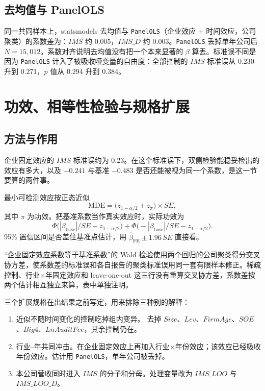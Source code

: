 \documentclass[11pt]{article}
\begin{document}
\subsection{去均值与 PanelOLS}

同一共同样本上，statsmodels 去均值与 \texttt{PanelOLS}（企业效应 + 时间效应，公司聚类）的系数差为：\(IMS\) 约 0.005，\(IMS\_D\) 约 0.003。\texttt{PanelOLS} 丢掉单年公司后 \(N=15{,}012\)。系数对齐说明去均值没有把一个本来显著的 \(\beta\) 算丢。标准误不同是因为 \texttt{PanelOLS} 计入了被吸收哑变量的自由度：全部控制的 \(IMS\) 标准误从 0.230 升到 0.271，\(p\) 值从 0.294 升到 0.384。

\section{功效、相等性检验与规格扩展}
\label{sec:power}

\subsection{方法与作用}

企业固定效应的 \(IMS\) 标准误约为 0.23。在这个标准误下，双侧检验能稳妥检出的效应有多大，以及 \(-0.241\) 与基准 \(-0.483\) 是否还能被视为同一个系数，是这一节要算的两件事。

最小可检测效应按正态近似
\begin{equation}
\mathrm{MDE}=\big(z_{1-\alpha/2}+z_{\pi}\big)\times SE,
\label{eq:mde}
\end{equation}
其中 \(\pi\) 为功效。把基准系数当作真实效应时，实际功效为
\[
\Phi\big(|\beta_{\mathrm{base}}|/SE-z_{1-\alpha/2}\big)+\Phi\big(-|\beta_{\mathrm{base}}|/SE-z_{1-\alpha/2}\big).
\]
95\% 置信区间是否盖住基准点估计，用 \(\hat\beta_{\mathrm{FE}}\pm 1.96\,SE\) 直接看。

``企业固定效应系数等于基准系数''的 Wald 检验使用两个回归的公司聚类得分交叉协方差，使系数差的标准误和各自报告的聚类标准误用同一套有限样本修正。稀疏控制、行业\(\times\)年固定效应和 leave-one-out 这三行没有重算交叉协方差，系数差按两个估计相互独立来算，表中单独注明。

三个扩展规格在出结果之前写定，用来排除三种别的解释：

\begin{enumerate}
\item 近似不随时间变化的控制吃掉组内变异。
去掉 \(Size\)、\(Lev\)、\(FirmAge\)、\(SOE\)、\(Big4\)、\(LnAuditFee\)，其余控制仍在。
\item 行业--年共同冲击。在企业固定效应上再加入行业\(\times\)年份效应；该效应已经吸收年份效应。估计用 \texttt{PanelOLS}，单年公司被丢掉。
\item 本公司营收同时进入 \(IMS\) 的分子和分母。处理变量改为 \(IMS\_LOO\) 与 \(IMS\_LOO\_D\)。
\end{enumerate}
\end{document}
